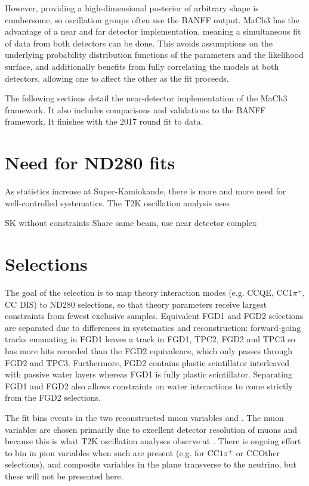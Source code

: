 However, providing a high-dimensional posterior of arbitrary shape is cumbersome, so oscillation groups often use the BANFF output. MaCh3 has the advantage of a near and far detector implementation, meaning a simultaneous fit of data from both detectors can be done. This avoids assumptions on the underlying probability distribution functions of the parameters and the likelihood surface, and additionally benefits from fully correlating the models at both detectors, allowing one to affect the other as the fit proceeds.

The following sections detail the near-detector implementation of the MaCh3 framework. It also includes comparisons and validations to the BANFF framework. It finishes with the 2017 round fit to data.

\section{Need for ND280 fits}
As statistics increase at Super-Kamiokande, there is more and more need for well-controlled systematics. The T2K oscillation analysis uses 

SK without constraints
Share same beam, use near detector complex

\section{Selections}
\label{sec:ND280:sel}
The goal of the selection is to map theory interaction modes (e.g. CCQE, CC1$\pi^+$, CC DIS) to ND280 selections, so that theory parameters receive largest constraints from fewest exclusive samples. Equivalent FGD1 and FGD2 selections are separated due to differences in systematics and reconstruction: forward-going tracks emanating in FGD1 leaves a track in FGD1, TPC2, FGD2 and TPC3 so has more hits recorded than the FGD2 equivalence, which only passes through FGD2 and TPC3. Furthermore, FGD2 contains plastic scintillator interleaved with passive water layers whereas FGD1 is fully plastic scintillator. Separating FGD1 and FGD2 also allows constraints on water interactions to come strictly from the FGD2 selections.

The fit bins events in the two reconstructed muon variables \pmu and \cosmu. The muon variables are chosen primarily due to excellent detector resolution of muons and because this is what T2K oscillation analyses observe at \sk. There is ongoing effort to bin in pion variables when such are present (e.g. for CC$1\pi^+$ or CCOther selections), and composite variables in the plane transverse to the neutrino, but these will not be presented here.

